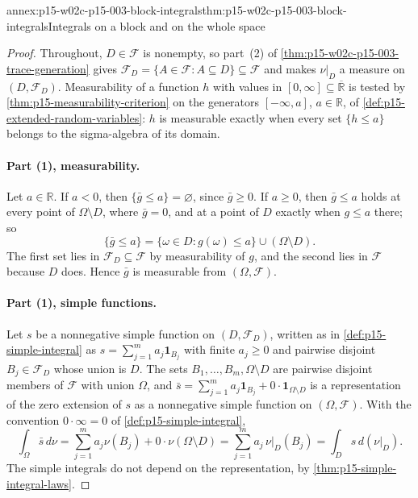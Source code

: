 \begin{annexitem}{annex:p15-w02c-p15-003-block-integrals}{thm:p15-w02c-p15-003-block-integrals}{Integrals on a block and on the whole space}
\begin{proof}
Throughout, \(D\in\mathcal F\) is nonempty, so part~(2) of
\cref{thm:p15-w02c-p15-003-trace-generation} gives
\(\mathcal F_D=\{A\in\mathcal F:A\subseteq D\}\subseteq\mathcal F\) and
makes \(\nu|_D\) a measure on \((D,\mathcal F_D)\). Measurability of a
function \(h\) with values in \([0,\infty]\subseteq\overline{\mathbb R}\)
is tested by \cref{thm:p15-measurability-criterion} on the generators
\([-\infty,a]\), \(a\in\mathbb R\), of
\cref{def:p15-extended-random-variables}: \(h\) is measurable exactly when
every set \(\{h\leq a\}\) belongs to the sigma-algebra of its domain.

\paragraph{Part (1), measurability.}
Let \(a\in\mathbb R\). If \(a<0\), then \(\{\bar g\leq a\}=\varnothing\),
since \(\bar g\geq0\). If \(a\geq0\), then \(\bar g\leq a\) holds at every
point of \(\Omega\setminus D\), where \(\bar g=0\), and at a point of \(D\)
exactly when \(g\leq a\) there; so
\[
 \{\bar g\leq a\}=\{\omega\in D:g(\omega)\leq a\}\cup(\Omega\setminus D).
\]
The first set lies in \(\mathcal F_D\subseteq\mathcal F\) by measurability
of \(g\), and the second lies in \(\mathcal F\) because \(D\) does. Hence
\(\bar g\) is measurable from \((\Omega,\mathcal F)\).

\paragraph{Part (1), simple functions.}
Let \(s\) be a nonnegative simple function on \((D,\mathcal F_D)\), written
as in \cref{def:p15-simple-integral} as
\(s=\sum_{j=1}^ma_j\mathbf1_{B_j}\) with finite \(a_j\geq0\) and pairwise
disjoint \(B_j\in\mathcal F_D\) whose union is \(D\). The sets
\(B_1,\ldots,B_m,\Omega\setminus D\) are pairwise disjoint members of
\(\mathcal F\) with union \(\Omega\), and
\(\bar s=\sum_{j=1}^ma_j\mathbf1_{B_j}+0\cdot\mathbf1_{\Omega\setminus D}\)
is a representation of the zero extension of \(s\) as a nonnegative simple
function on \((\Omega,\mathcal F)\). With the convention
\(0\cdot\infty=0\) of \cref{def:p15-simple-integral},
\[
 \int_\Omega\bar s\,d\nu
  =\sum_{j=1}^ma_j\nu(B_j)+0\cdot\nu(\Omega\setminus D)
  =\sum_{j=1}^ma_j\,\nu|_D(B_j)
  =\int_Ds\,d(\nu|_D).
\]
The simple integrals do not depend on the representation, by
\cref{thm:p15-simple-integral-laws}.


\end{proof}
\end{annexitem}
